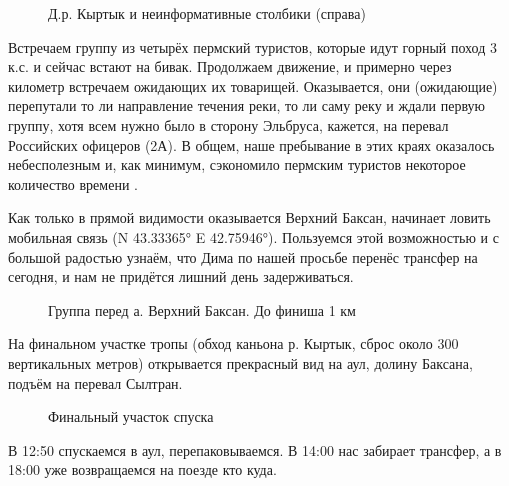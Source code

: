 \begin{figure}[h!]
	\centering
	\caption{Д.р. Кыртык и неинформативные столбики (справа)}
	\label{fig:kyrtyk}
\end{figure}

Встречаем группу из четырёх пермский туристов, которые идут горный поход 3 к.с. и сейчас встают на бивак. Продолжаем движение, и примерно через километр встречаем ожидающих их товарищей. Оказывается, они (ожидающие) перепутали то ли направление течения реки, то ли саму реку и ждали первую группу, хотя всем нужно было в сторону Эльбруса, кажется, на перевал Российских офицеров (2А). В общем, наше пребывание в этих краях оказалось небесполезным и, как минимум, сэкономило пермским туристов некоторое количество времени \smiley.


Как только в прямой видимости оказывается Верхний Баксан, начинает ловить мобильная связь (N 43.33365° E 42.75946°). Пользуемся этой возможностью и с большой радостью узнаём, что Дима по нашей просьбе перенёс трансфер на сегодня, и нам не придётся лишний день задерживаться. 

\begin{figure}[h!]
	\centering
	\caption{Группа перед а. Верхний Баксан. До финиша 1 км}
	\label{fig:finish}
\end{figure}

На финальном участке тропы (обход каньона р. Кыртык, сброс около 300 вертикальных метров) открывается прекрасный вид на аул, долину Баксана, подъём на перевал Сылтран.

\begin{figure}[h!]
	\centering
	\caption{Финальный участок спуска}
	\label{fig:baksan}
\end{figure}

В 12:50 спускаемся в аул, перепаковываемся. В 14:00 нас забирает трансфер, а в 18:00 уже возвращаемся на поезде кто куда.

\clearpage
